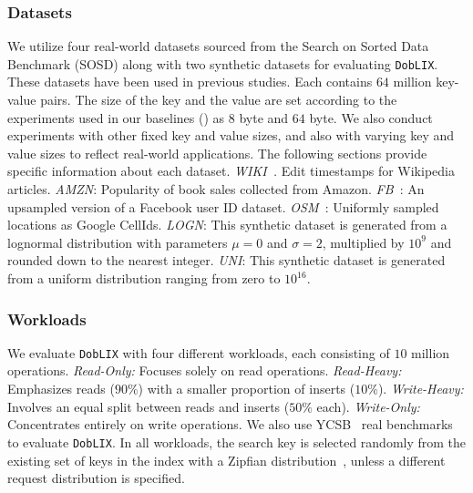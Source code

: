 \vspace{1pt}
\noindent\subsubsection{\textbf{Datasets}} 
We utilize four real-world datasets sourced from the Search on Sorted Data Benchmark (SOSD)\cite{kipf2019sosd} along with two synthetic datasets for evaluating \texttt{DobLIX}. These datasets have been used in previous studies\cite{TridentKV2022, Bourbon2020, ding2020alex}. Each contains $64$ million key-value pairs. The size of the key and the value are set according to the experiments used in our baselines (\cite{Bourbon2020,TridentKV2022}) as $8$ byte and $64$ byte. We also conduct experiments with other fixed key and value sizes, and also with varying key and value sizes to reflect real-world applications.
The following sections provide specific information about each dataset. \textit{WIKI~\cite{WikiTS}.} Edit timestamps for Wikipedia articles. \textit{AMZN}: Popularity of book sales collected from Amazon. \textit{FB~\cite{FB}}: An upsampled version of a Facebook user ID dataset.  \textit{OSM~\cite{OSM}}: Uniformly sampled locations as Google CellIds.  \textit{LOGN}: This synthetic dataset is generated from a lognormal distribution with parameters $\mu=0$ and $\sigma=2$, multiplied by $10^9$ and rounded down to the nearest integer. \textit{UNI}: This synthetic dataset is generated from a uniform distribution ranging from zero to $10^{16}$.

\vspace{1pt}
\noindent
\subsubsection{\textbf{Workloads}}
We evaluate \texttt{DobLIX} with four different workloads, each consisting of $10$ million operations. \textit{Read-Only:} Focuses solely on read operations. \textit{Read-Heavy:} Emphasizes reads ($90\%$) with a smaller proportion of inserts ($10\%$). \textit{Write-Heavy:} Involves an equal split between reads and inserts ($50\%$ each). \textit{Write-Only:} Concentrates entirely on write operations.
We also use YCSB~\cite{cooper2010benchmarking} real benchmarks to evaluate \texttt{DobLIX}. In all workloads, the search key is selected randomly from the existing set of keys in the index with a Zipfian distribution~\cite{cormode2008finding}, unless a different request distribution is specified.

\vspace{1pt}
\noindent
